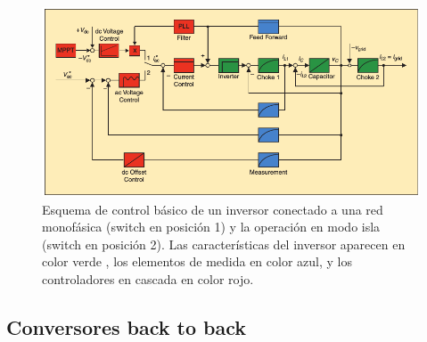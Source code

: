 \documentclass[12pt, letterpaper]{report}
\begin{document}
\begin{figure}[h]
\centering
\includegraphics[width=1\linewidth]{imagenes/tension_pv}
\caption{Esquema de control básico de un inversor conectado a una red monofásica (switch en posición 1) y la operación en modo isla (switch en posición 2). Las características del inversor aparecen en color verde , los elementos de medida en color azul, y los controladores en cascada en color rojo.\cite{Bacha2015}}
\label{fig:tensionpv}
\end{figure}

\subsection{Conversores back to back}

\end{document}
